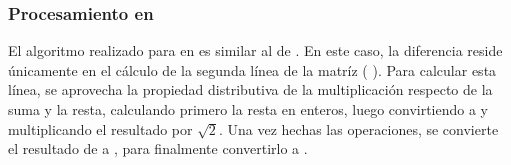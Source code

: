 \subsubsection{Procesamiento en }
	El algoritmo realizado para  en  es similar al de . En este caso, la diferencia reside 
únicamente en el cálculo de la segunda línea de la matríz (
). Para calcular esta línea, se aprovecha la propiedad distributiva de la multiplicación respecto de la suma y la resta, calculando primero la resta 
en enteros, luego convirtiendo a  y multiplicando el resultado por $\sqrt{2}$. Una vez hechas las operaciones, se convierte el resultado 
de  a , para finalmente convertirlo a .

\begin{center}
\end{center}

